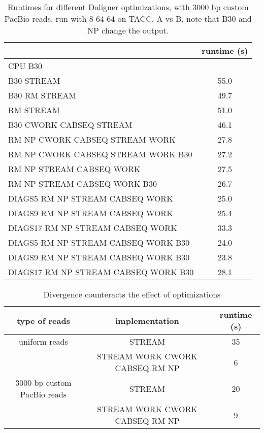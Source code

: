 \documentclass[../main/thesis.tex]{subfiles}
\begin{document}
\begin{table}
\centering
\caption{Runtimes for different Daligner optimizations, with 3000 bp custom PacBio reads, run with 8 64 64 on TACC, A vs B, note that B30 and NP change the output.}
\label{tbl:daligner3}
\begin{tabular}{l c}
& runtime (s) \\ \hline
CPU B30 & \\
B30 STREAM & 55.0 \\
B30 RM STREAM & 49.7 \\
RM STREAM & 51.0 \\
B30 CWORK CABSEQ STREAM & 46.1 \\ \hline
RM NP CWORK CABSEQ STREAM WORK & 27.8 \\
RM NP CWORK CABSEQ STREAM WORK B30 & 27.2 \\
RM NP STREAM CABSEQ WORK & 27.5 \\
RM NP STREAM CABSEQ WORK B30 & 26.7 \\
DIAGS5 RM NP STREAM CABSEQ WORK & 25.0 \\
DIAGS9 RM NP STREAM CABSEQ WORK & 25.4 \\
DIAGS17 RM NP STREAM CABSEQ WORK & 33.3 \\
DIAGS5 RM NP STREAM CABSEQ WORK B30 & 24.0 \\
DIAGS9 RM NP STREAM CABSEQ WORK B30 & 23.8 \\
DIAGS17 RM NP STREAM CABSEQ WORK B30 & 28.1 \\
\end{tabular}
\end{table}

\begin{table}
\centering
\caption{Divergence counteracts the effect of optimizations}
\label{tbl:daligner4}
\begin{tabular}{c|c|c}
type of reads & implementation & runtime (s) \\ \hline
uniform reads & STREAM & 35 \\
& STREAM WORK CWORK CABSEQ RM NP & 6 \\ \hline
3000 bp custom PacBio reads & STREAM & 20 \\
& STREAM WORK CWORK CABSEQ RM NP & 9 \\
\end{tabular}
\end{table}
\end{document}
